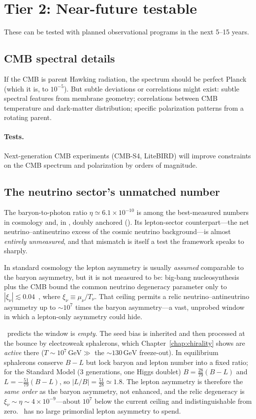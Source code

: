 \section{Tier 2: Near-future testable}

These can be tested with planned observational programs in the next 5--15 years.

\subsection{CMB spectral details}

If the CMB is parent Hawking radiation, the spectrum should be perfect Planck
(which it is, to $10^{-5}$). But subtle deviations or correlations might exist:
subtle spectral features from membrane geometry; correlations between CMB
temperature and dark-matter distribution; specific polarization patterns from a
rotating parent.
\paragraph{Tests.} Next-generation CMB experiments (CMB-S4, LiteBIRD) will
improve constraints on the CMB spectrum and polarization by orders of magnitude.

\subsection{The neutrino sector's unmatched number}
\label{sec:lepton-asymmetry}

The baryon-to-photon ratio $\eta\simeq6.1\times10^{-10}$ is among the
best-measured numbers in cosmology and, in \SCT, doubly anchored
(). Its lepton-sector counterpart---the net
neutrino--antineutrino excess of the cosmic neutrino background---is almost
\emph{entirely unmeasured}, and that mismatch is itself a test the framework
speaks to sharply.

In standard cosmology the lepton asymmetry is usually \emph{assumed} comparable
to the baryon asymmetry, but it is not measured to be: big-bang nucleosynthesis
plus the CMB bound the common neutrino degeneracy parameter only to
$|\xi_\nu|\lesssim0.04$~\citep{oldengott2017}, where $\xi_\nu\equiv\mu_\nu/T_\nu$.
That ceiling permits a relic neutrino--antineutrino asymmetry up to $\sim$$10^{7}$
times the baryon asymmetry---a vast, unprobed window in which a lepton-only
asymmetry could hide.

\SCT\ predicts the window is \emph{empty}. The seed bias is inherited and then
processed at the bounce by electroweak sphalerons, which
Chapter~\ref{chap:chirality} shows are \emph{active} there
($T\sim10^{7}\,\mathrm{GeV}\gg$ the $\sim$$130\,\mathrm{GeV}$ freeze-out). In
equilibrium sphalerons conserve $B{-}L$ but lock baryon and lepton number into a
fixed ratio; for the Standard Model ($3$ generations, one Higgs doublet)
$B=\tfrac{28}{79}(B{-}L)$ and $L=-\tfrac{51}{79}(B{-}L)$, so
$|L/B|=\tfrac{51}{28}\simeq1.8$. The lepton asymmetry is therefore the \emph{same
order} as the baryon asymmetry, not enhanced, and the relic degeneracy is
$\xi_\nu\sim\eta\sim4\times10^{-9}$---about $10^{7}$ below the current ceiling and
indistinguishable from zero. \SCT\ has no large primordial lepton asymmetry to
spend.


